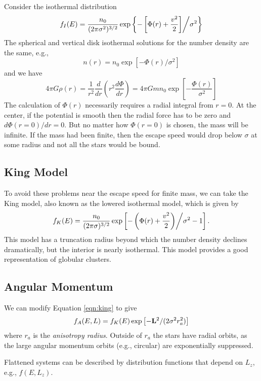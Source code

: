 \documentclass[]{article}
\begin{document}
Consider the isothermal distribution
\begin{equation}
f_{I}(E) = \frac{n_0}{(2\pi\sigma^2)^{3/2}}\exp\left\{-\left[\Phi(r) + \frac{v^2}{2}\right]\middle/\sigma^2\right\}
\end{equation}
\noindent
The spherical and vertical disk isothermal solutions for the number density are the same, e.g.,
\begin{equation}
n(r) = n_0 \exp\left[-\Phi(r)/\sigma^2\right]
\end{equation}
\noindent
and we have
\begin{equation}
4\pi G \rho(r) = \frac{1}{r^2} \frac{d}{d r}\left(r^2\frac{d\Phi}{dr}\right) = 4\pi G m n_0 \exp\left[-\frac{\Phi(r)}{\sigma^2}\right]
\end{equation}
\noindent
The calculation of $\Phi(r)$ necessarily requires a radial integral from $r=0$.  At the center,
if the potential is smooth then the radial force has to be zero and $d\Phi(r=0)/dr =0$.  But
no matter how $\Phi(r=0)$ is chosen, the mass will be infinite.  If the mass had been
finite, then the escape speed would drop below $\sigma$ at some radius and not all the stars 
would be bound.

\subsection{King Model}

To avoid these problems near the escape speed for finite mass, we can take the King model,
also known as the lowered isothermal model, which is given by
\begin{equation}
\label{eqn:king}
f_K(E) = \frac{n_0}{(2\pi\sigma)^{3/2}}\exp\left[-\left(\Phi(r) + \frac{v^2}{2}\right)\middle/\sigma^{2} - 1\right].
\end{equation}
\noindent
This model has a truncation radius beyond which the number density declines dramatically, but the interior is
nearly isothermal. This model provides a good representation of globular clusters.


\subsection{Angular Momentum}

We can modify Equation \ref{eqn:king} to give
\begin{equation}
f_A(E,L) = f_K(E)\exp\left[-\mathbf{L}^2/(2\sigma^2 r_a^2)\right]
\end{equation}
\noindent
where $r_a$ is the {\it anisotropy radius}.  Outside of $r_a$ the
stars have radial orbits, as the large angular momentum orbits (e.g.,
circular) are
exponentially suppressed.


Flattened systems can be described by distribution functions that
depend on $L_z$, e.g., $f(E,L_z)$.
\end{document}
